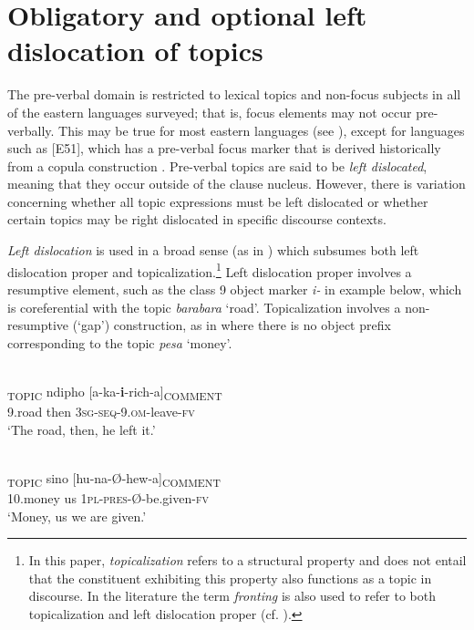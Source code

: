 \documentclass[output=paper]{langsci/langscibook}
\begin{document}
\section{Obligatory and optional left dislocation of topics}\label{§3:obligatory.nicolle}

The pre-verbal domain is restricted to lexical topics and non-focus subjects in all of the eastern  languages surveyed; that is, focus elements may not occur pre-verbally. This may be true for most eastern  languages (see \citealt{zerbian2006,vanderwal2009,yoneda2011}), except for languages such as  [E51], which has a pre-verbal focus marker that is derived historically from a copula construction \citep{schwarz2003kikuyu,schwarz2007kikuyu,vanderwal2014}. Pre-verbal topics are said to be \textit{left dislocated}, meaning that they occur outside of the clause nucleus. However, there is variation concerning whether all topic expressions must be left dislocated or whether certain topics may be right dislocated in specific discourse contexts.

\textit{Left dislocation} is used in a broad sense (as in \citealt{shaeretal2009}) which subsumes both left dislocation proper and topicalization.\footnote{In this paper, \textit{topicalizat}\textit{ion} refers to a structural property and does not entail that the constituent exhibiting this property also functions as a topic in discourse. In the literature the term \textit{fronting} is also used to refer to both topicalization and left dislocation proper (cf. \citealt[313]{cohen2009}).} Left dislocation proper involves a resumptive element, such as the class 9 object marker \textit{i}\textit{-} in example  below, which is coreferential with the topic \textit{barabara} ‘road’. Topicalization involves a non-resumptive (‘gap’) construction, as in  where there is no object prefix corresponding to the topic \textit{pesa} ‘money’.

\ea\label{ex:2.nicolle}
\\
\gll [Barabara]\textsubscript{TOPIC} ndipho [a-ka-\textbf{i}-rich-a]\textsubscript{COMMENT}\\
     {\db}9.road then {\db}\textsc{3sg-seq}-9.\textsc{om}-leave-\textsc{fv}\\
\glt ‘The road, then, he left it.’
\z

\ea\label{ex:3.nicolle}
\\
\gll [Pesa]\textsubscript{TOPIC} sino [hu-na-Ø-hew-a]\textsubscript{COMMENT}\\
{\db}10.money us {\db}\textsc{1pl-pres}-Ø-be.given-\textsc{fv}\\
\glt ‘Money, us we are given.’
\z
\end{document}
